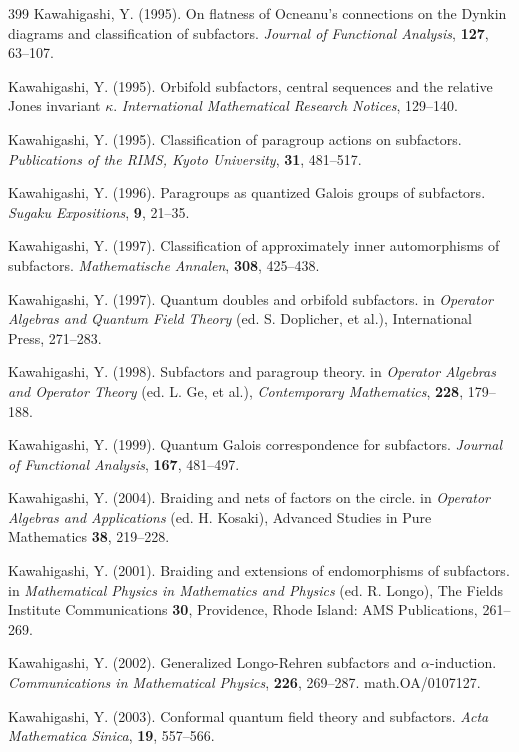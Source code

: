 \documentclass[12pt]{article}
\theoremstyle{plain}
\theoremstyle{definition}
\numberwithin{equation}{section}
\begin{document}
\begin{thebibliography} {399}
Kawahigashi, Y. (1995).
On flatness of Ocneanu's connections on the Dynkin diagrams
and classification of subfactors.
{\em Journal of Functional Analysis},
{\bf 127}, 63--107.

Kawahigashi, Y. (1995).
Orbifold subfactors, central sequences and the relative Jones
invariant $\kappa$.
{\em International Mathematical Research Notices},
129--140.

Kawahigashi, Y. (1995).
Classification of paragroup actions on subfactors.
{\em Publications of the RIMS, Kyoto University}, 
{\bf 31}, 481--517.

Kawahigashi, Y. (1996).
Paragroups as quantized Galois groups of subfactors.
{\em Sugaku Expositions}, {\bf 9}, 21--35.

Kawahigashi, Y. (1997).
Classification of approximately inner automorphisms of
subfactors.
{\em Mathematische Annalen}, {\bf 308}, 425--438.

Kawahigashi, Y. (1997).
Quantum doubles and orbifold subfactors.
in {\em Operator Algebras and Quantum Field Theory}
(ed. S. Doplicher, et al.), International Press, 271--283.

Kawahigashi, Y. (1998).
Subfactors and paragroup theory.
in {\em Operator Algebras and Operator Theory} (ed. L. Ge, et al.),
{\em Contemporary Mathematics}, {\bf 228}, 179--188.

Kawahigashi, Y. (1999).
Quantum Galois correspondence for subfactors.
{\em Journal of Functional Analysis}, {\bf 167}, 481--497.

Kawahigashi, Y. (2004).
Braiding and nets of factors on the circle.
in {\em Operator Algebras and Applications} (ed. H. Kosaki),
Advanced Studies in Pure Mathematics {\bf 38}, 219--228.

Kawahigashi, Y. (2001).
Braiding and extensions of endomorphisms of subfactors.
in {\em Mathematical Physics in Mathematics and Physics} (ed. R. Longo),
The Fields Institute Communications {\bf 30}, Providence, Rhode Island:
AMS Publications, 261--269.

Kawahigashi, Y. (2002).
Generalized Longo-Rehren subfactors and $\alpha$-induction.
{\em Communications in Mathematical Physics}, {\bf 226}, 269--287.
math.OA/0107127.

Kawahigashi, Y. (2003).
Conformal quantum field theory and subfactors.
{\em Acta Mathematica Sinica}, {\bf 19}, 557--566.


\end{thebibliography}
\end{document}
